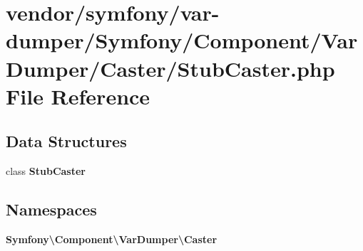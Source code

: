 \section{vendor/symfony/var-\/dumper/\+Symfony/\+Component/\+Var\+Dumper/\+Caster/\+Stub\+Caster.php File Reference}
\label{_stub_caster_8php}
\subsection*{Data Structures}
\begin{DoxyCompactItemize}
\item 
class {\bf Stub\+Caster}
\end{DoxyCompactItemize}
\subsection*{Namespaces}
\begin{DoxyCompactItemize}
\item 
 {\bf Symfony\textbackslash{}\+Component\textbackslash{}\+Var\+Dumper\textbackslash{}\+Caster}
\end{DoxyCompactItemize}
